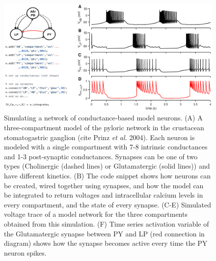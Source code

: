 \documentclass{frontiersSCNS} %
\begin{document}
\begin{figure}[!htb]
	\centering
	\includegraphics[width=1.0\linewidth]{gfx/figure_network}
	\caption{Simulating a network of conductance-based model neurons. (A) A three-compartment model of the pyloric network in the crustacean stomatogastric ganglion (cite Prinz \textit{et al.} 2004). Each neuron is modeled with a single compartment with 7-8 intrinsic conductances and 1-3 post-synaptic conductances. Synapses can be one of two types (Cholinergic (dashed lines) or Glutamatergic (solid lines)) and have different kinetics. (B) The code snippet shows how neurons can be created, wired together using synapses, and how the model can be integrated to return voltages and intracellular calcium levels in every compartment, and the state of every synapse. (C-E) Simulated voltage trace of a model network for the three compartments obtained from this simulation. (F) Time series activation variable of the Glutamatergic synapse between PY and LP (red connection in diagram) shows how the synapse becomes active every time the PY neuron spikes.}
	\label{fig:figurenetwork}
\end{figure}



\clearpage
\end{document}
